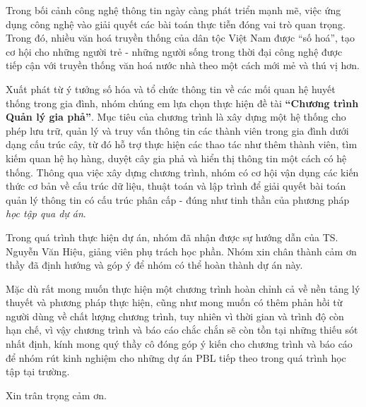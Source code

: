 \leavevmode{\parindent=1em\indent} Trong bối cảnh công nghệ thông tin ngày càng phát triển mạnh mẽ, việc ứng dụng công nghệ vào giải quyết các bài toán thực tiễn đóng vai trò quan trọng. Trong đó, nhiều văn hoá truyền thống của dân tộc Việt Nam được ``số hoá'', tạo cơ hội cho những người trẻ - những người sống trong thời đại công nghệ được tiếp cận với truyền thống văn hoá nước nhà theo một cách mới mẻ và thú vị hơn.

\leavevmode{\parindent=1em\indent} Xuất phát từ ý tưởng số hóa và tổ chức thông tin về các mối quan hệ huyết thống trong gia đình, nhóm chúng em lựa chọn thực hiện đề tài \textbf{``Chương trình Quản lý gia phả''}. Mục tiêu của chương trình là xây dựng một hệ thống cho phép lưu trữ, quản lý và truy vấn thông tin các thành viên trong gia đình dưới dạng cấu trúc cây, từ đó hỗ trợ thực hiện các thao tác như thêm thành viên, tìm kiếm quan hệ họ hàng, duyệt cây gia phả và hiển thị thông tin một cách có hệ thống. Thông qua việc xây dựng chương trình, nhóm có cơ hội vận dụng các kiến thức cơ bản về cấu trúc dữ liệu, thuật toán và lập trình để giải quyết bài toán quản lý thông tin có cấu trúc phân cấp - đúng như tinh thần của phương pháp \textit{học tập qua dự án}.

\leavevmode{\parindent=1em\indent} Trong quá trình thực hiện dự án, nhóm đã nhận được sự hướng dẫn của TS. Nguyễn Văn Hiệu, giảng viên phụ trách học phần. Nhóm xin chân thành cảm ơn thầy đã định hướng và góp ý để nhóm có thể hoàn thành dự án này.

\leavevmode{\parindent=1em\indent} Mặc dù rất mong muốn thực hiện một chương trình hoàn chỉnh cả về nền tảng lý thuyết và phương pháp thực hiện, cũng như mong muốn có thêm phản hồi từ người dùng về chất lượng chương trình, tuy nhiên vì thời gian và trình độ còn hạn chế, vì vậy chương trình và báo cáo chắc chắn sẽ còn tồn tại những thiếu sót nhất định, kính mong quý thầy cô đóng góp ý kiến cho chương trình và báo cáo để nhóm rút kinh nghiệm cho những dự án PBL tiếp theo trong quá trình học tập tại trường.

\leavevmode{\parindent=1em\indent} Xin trân trọng cảm ơn.
